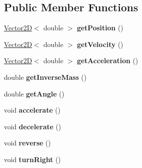\subsection*{Public Member Functions}
\begin{DoxyCompactItemize}
\item 
\hypertarget{class_collidable_ad5022811d28d0db8a58e4ecfda914f4b}{}\hyperlink{class_vector2_d}{Vector2\+D}$<$ double $>$ {\bfseries get\+Position} ()\label{class_collidable_ad5022811d28d0db8a58e4ecfda914f4b}

\item 
\hypertarget{class_collidable_abfdcd815a5f8aabd860e2b69bc4bea21}{}\hyperlink{class_vector2_d}{Vector2\+D}$<$ double $>$ {\bfseries get\+Velocity} ()\label{class_collidable_abfdcd815a5f8aabd860e2b69bc4bea21}

\item 
\hypertarget{class_collidable_ac6387b72fd5e194cd3e38cf22e30e75a}{}\hyperlink{class_vector2_d}{Vector2\+D}$<$ double $>$ {\bfseries get\+Acceleration} ()\label{class_collidable_ac6387b72fd5e194cd3e38cf22e30e75a}

\item 
\hypertarget{class_collidable_a3ceb05fc466651c75f1c23231a9cf7a9}{}double {\bfseries get\+Inverse\+Mass} ()\label{class_collidable_a3ceb05fc466651c75f1c23231a9cf7a9}

\item 
\hypertarget{class_collidable_aee9547a28db55d503164cdf5f3d069fc}{}double {\bfseries get\+Angle} ()\label{class_collidable_aee9547a28db55d503164cdf5f3d069fc}

\item 
\hypertarget{class_collidable_af00403ad8cd4daf89cc38653f7cb8176}{}void {\bfseries accelerate} ()\label{class_collidable_af00403ad8cd4daf89cc38653f7cb8176}

\item 
\hypertarget{class_collidable_a387fbafb5027cd3d53578aadd2838e38}{}void {\bfseries decelerate} ()\label{class_collidable_a387fbafb5027cd3d53578aadd2838e38}

\item 
\hypertarget{class_collidable_abd76296323992091a7e1f5a15c82861c}{}void {\bfseries reverse} ()\label{class_collidable_abd76296323992091a7e1f5a15c82861c}

\item 
\hypertarget{class_collidable_aad6377534a6dd68073a0d4283c9349fc}{}void {\bfseries turn\+Right} ()\label{class_collidable_aad6377534a6dd68073a0d4283c9349fc}


\end{DoxyCompactItemize}
